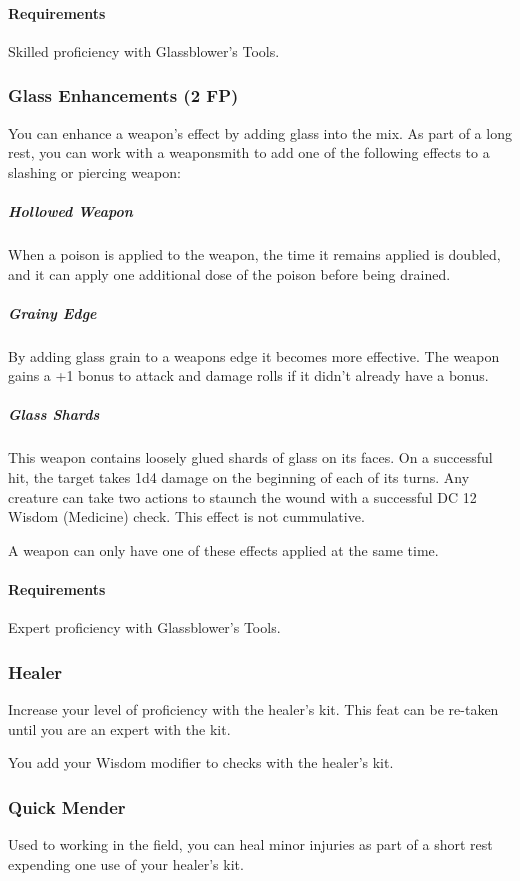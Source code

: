     \paragraph{Requirements} Skilled proficiency with Glassblower's Tools.
\subsubsection{Glass Enhancements (2 FP)} \label{feat::glassenhancement}
    You can enhance a weapon's effect by adding glass into the mix.
    As part of a long rest, you can work with a weaponsmith to add one of the following effects to a slashing or piercing weapon:
    \subparagraph{Hollowed Weapon} When a poison is applied to the weapon, the time it remains applied is doubled, and it can apply one additional dose of the poison before being drained.
    \subparagraph{Grainy Edge} By adding glass grain to a weapons edge it becomes more effective.
    The weapon gains a +1 bonus to attack and damage rolls if it didn't already have a bonus.
    \subparagraph{Glass Shards} This weapon contains loosely glued shards of glass on its faces.
    On a successful hit, the target takes 1d4 damage on the beginning of each of its turns.
    Any creature can take two actions to staunch the wound with a successful DC 12 Wisdom (Medicine) check.
    This effect is not cummulative.

    A weapon can only have one of these effects applied at the same time.
    \paragraph{Requirements} Expert proficiency with Glassblower's Tools.

\subsubsection{Healer} \label{feat::healer}
    Increase your level of proficiency with the healer's kit.
    This feat can be re-taken until you are an expert with the kit.

    You add your Wisdom modifier to checks with the healer's kit.
\subsubsection{Quick Mender} \label{feat::quickmender}
    Used to working in the field, you can heal minor injuries as part of a short rest expending one use of your healer's kit.

